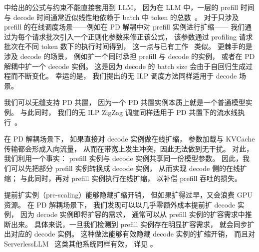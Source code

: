 \textsection{\ref{sec:design-pp}} 中给出的公式与约束不能直接套用到 LLM，
因为在 LLM 中，一层的 prefill 时间与 decode 时间通常近似线性地依赖于 batch 中 token 的总数~\cite{DBLP:conf/isca/PatelCZSGMB24,DBLP:journals/corr/abs-2404-09526}。
对于只涉及 prefill 的在线调度场景——例如在 PD 解耦中对 prefill 实例进行扩缩——
我们通过为每个请求批次引入一个正则化参数来修正该公式，
该参数通过 profiling 请求批次在不同 token 数下的执行时间得到，
这一点与已有工作~\cite{DBLP:journals/corr/abs-2404-09526} 类似。
更棘手的是涉及 decode 的场景，
例如扩一个同时承担 prefill 与 decode 的实例，
或者在 PD 解耦中扩一个 decode 实例。
这是因为 decode 的 batch size 会由于自回归生成过程而不断变化。
幸运的是，
我们提出的无 ILP 调度方法同样适用于 decode 场景。

我们可以无缝支持 PD 共置，
因为一个 PD 共置实例本质上就是一个普通模型实例。
与此同时，
我们的无 ILP ZigZag 调度同样适用于 PD 共置下的流水线执行~\cite{298679}。

在 PD 解耦场景下，
如果直接对 decode 实例做在线扩缩，
参数加载与 KVCache 传输都会形成入向流量，
从而在带宽上发生冲突，因此无法做到无干扰。
对此，我们利用一个事实：
prefill 实例与 decode 实例共享同一份模型参数。
因此，我们可以先把部分 prefill 实例转换成 decode 实例，
从而实现 decode 侧的在线扩缩；
与此同时，再对 prefill 实例执行在线扩缩，
以补偿 prefill 吞吐的损失。

提前扩实例（pre-scaling）能够隐藏扩缩开销，
但如果扩得过早，又会浪费 GPU 资源。
在 PD 解耦场景下，
我们发现可以以几乎零额外成本提前扩 decode 实例，
因为 decode 实例即将扩容的需求，
通常可以从 prefill 实例的扩容需求中推断出来。
具体来说，一旦我们检测到 prefill 实例存在明显扩容需求，
就会同步扩出对应的 decode 实例。
这种做法能够有效隐藏 decode 实例的扩缩开销，
而且对 ServerlessLLM~\cite{DBLP:journals/corr/abs-2401-14351} 这类其他系统同样有效，
详见 \textsection{\ref{sec:eval-app}}。
